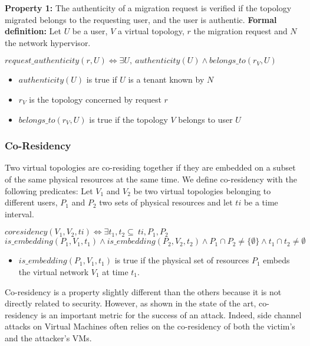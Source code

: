 \textbf{Property 1:} The authenticity of a migration request is verified if the topology migrated belongs to the requesting user, and the user is authentic.
\newline
\textbf{Formal definition: } Let $U$ be a user, $V$ a virtual topology, $r$ the migration request and $N$ the network hypervisor.

\begin{myformula}
$request\_authenticity(r,U) \Leftrightarrow \exists U,~authenticity(U) \wedge belongs\_to(r_V,U)$
\end{myformula}
\begin{itemize}
\item $authenticity(U)$ is true if $U$ is a tenant known by $N$
\item $r_V$ is the topology concerned by request $r$
\item $belongs\_to(r_V,U)$ is true if the topology $V$ belongs to user $U$
\end{itemize}


\subsubsection{Co-Residency}
\label{sec:prop-cores}
Two virtual topologies are co-residing together if they are embedded on a subset of the same physical resources at the same time.
We define co-residency with the following predicates:
Let $V_1$ and $V_2$ be two virtual topologies belonging to different users, $P_1$ and $P_2$ two sets of physical resources and let $ti$ be a time interval.
\begin{myformula}
$coresidency(V_1,V_2,ti) \Leftrightarrow \exists t_1,t_2\subseteq~ti,P_1,P_2$ $is\_embedding(P_1,V_1,t_1) \wedge is\_embedding(P_2,V_2,t_2) \wedge P_1 \cap P_2 \neq \{\emptyset\} \wedge t_1 \cap t_2  \neq \emptyset$
\end{myformula}

\begin{itemize}
    \item $is\_embedding(P_1,V_1,t_1)$ is true if the physical set of resources $P_1$ embeds the virtual network $V_1$ at time $t_1$.
\end{itemize}

Co-residency is a property slightly different than the others because it is not directly related to security.
However, as shown in the state of the art, co-residency is an important metric for the success of an attack.
Indeed, side channel attacks on Virtual Machines often relies on the co-residency of both the victim's and the attacker's VMs.



